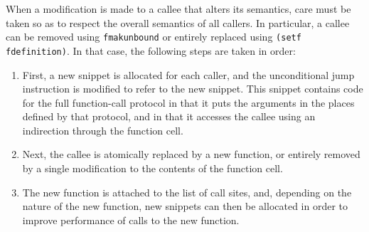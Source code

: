 When a modification is made to a callee that alters its semantics,
care must be taken so as to respect the overall semantics of all
callers.  In particular, a callee can be removed using
\texttt{fmakunbound} or entirely replaced using \texttt{(setf
  fdefinition)}.  In that case, the following steps are taken in
order:

\begin{enumerate}
\item First, a new snippet is allocated for each caller, and the
  unconditional jump instruction is modified to refer to the new
  snippet.  This snippet contains code for the full function-call
  protocol in that it puts the arguments in the places defined by that
  protocol, and in that it accesses the callee using an indirection
  through the function cell.
\item Next, the callee is atomically replaced by a new function, or
  entirely removed by a single modification to the contents of the
  function cell.
\item The new function is attached to the list of call sites, and,
  depending on the nature of the new function, new snippets can then
  be allocated in order to improve performance of calls to the new
  function.
\end{enumerate}

